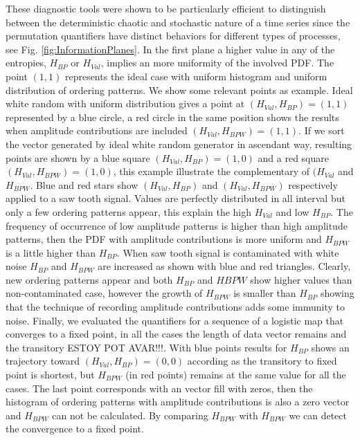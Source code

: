 These diagnostic tools were shown to be particularly efficient to distinguish between the deterministic chaotic and stochastic nature of a time series since the permutation quantifiers have distinct behaviors for different types of processes, see Fig. \ref{fig:InformationPlanes}.
In the first plane a higher value in any of the entropies, $H_{BP}$ or $H_{Val}$, implies an more uniformity of the involved PDF.
The point $(1,1)$ represents the ideal case with uniform histogram and uniform distribution of ordering patterns.
We show some relevant points as example.
Ideal white random with uniform distribution gives a point at $(H_{Val}, H_{BP})=(1, 1)$ represented by a blue circle, a red circle in the same position shows the results when amplitude contributions are included $(H_{Val}, H_{BPW})=(1, 1)$.
If we sort the vector generated by ideal white random generator in ascendant way, resulting points are shown by a blue square $(H_{Val}, H_{BP})=(1, 0)$ and a red square $(H_{Val}, H_{BPW})=(1, 0)$, this example illustrate the complementary of $(H_{Val}$ and $H_{BPW}$.
Blue and red stars show $(H_{Val}, H_{BP})$ and $(H_{Val}, H_{BPW})$ respectively applied to a saw tooth signal.
Values are perfectly distributed in all interval but only a few ordering patterns appear, this explain the high $H_{Val}$ and low $H_{BP}$.
The frequency of occurrence of low amplitude patterns is higher than high amplitude patterns, then the PDF with amplitude contributions is more uniform and $H_{BPW}$ is a little higher than $H_{BP}$.
When saw tooth signal is contaminated with white noise $H_{BP}$ and $H_{BPW}$ are increased as shown with blue and red triangles.
Clearly, new ordering patterns appear and both $H_{BP}$ and $H{BPW}$ show higher values than non-contaminated case, however the growth of $H_{BPW}$ is smaller than $H_{BP}$ showing that the technique of recording amplitude contributions adds some immunity to noise.
Finally, we evaluated the quantifiers for a sequence of a logistic map that converges to a fixed point, in all the cases the length of data vector remains and the transitory ESTOY POT AVAR!!!.
With blue points results for $H_{BP}$ shows an trajectory toward $(H_{Val}, H_{BP})=(0, 0)$ according as the transitory to fixed point is shortest, but $H_{BPW}$ (in red points) remains at the same value for all the cases.
The last point corresponds with an vector fill with zeros, then the histogram of ordering patterns with amplitude contributions is also a zero vector and $H_{BPW}$ can not be calculated.
By comparing $H_{BPW}$ with $H_{BPW}$ we can detect the convergence to a fixed point.

